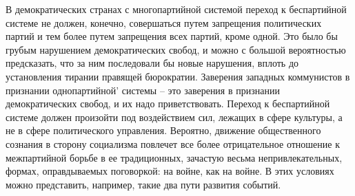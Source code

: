 \documentclass{book}
\begin{document}
В демократических странах с многопартийной системой пе­реход к беспартийной системе не должен, конечно, совершать­ся путем запрещения политических партий и тем более путем запрещения всех партий, кроме одной. Это было бы грубым нарушением демократических свобод, и можно с большой вероятностью предсказать, что за ним последовали бы новые нарушения, вплоть до установления тирании правящей бюрократии. Заверения западных коммунистов в признании однопартийной' системы -- это заверения в признании демократических свобод, и их надо приветствовать. Переход к беспартийной системе должен произойти под воздействием сил, лежащих в сфере культуры, а не в сфере политического управления. Вероятно, движение общественного сознания в сторону социализма повлечет все более отрицательное отношение к межпартийной борьбе в ее традиционных, зачастую весьма непривлекательных, формах, оправдываемых поговоркой: на войне, как на войне. В этих условиях можно представить, например, такие два пути развития событий.
\end{document}

